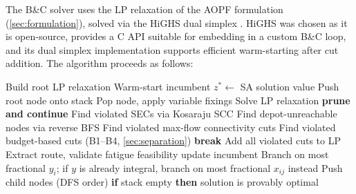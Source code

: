 \documentclass[11pt,a4paper]{article}
\begin{document}
The B\&C solver uses the LP relaxation of the AOPF formulation (\cref{sec:formulation}), solved via the HiGHS dual simplex \citep{huangfu2018highs}.
HiGHS was chosen as it is open-source, provides a C API suitable for embedding in a custom B\&C loop, and its dual simplex implementation supports efficient warm-starting after cut addition.
The algorithm proceeds as follows:

\begin{algorithm}[H]
\caption{Branch-and-Cut for AOPF}
\label{alg:bnc}
\begin{algorithmic}[1]
\State Build root LP relaxation
\State Warm-start incumbent $z^* \gets$ SA solution value
\State Push root node onto stack
  \State Pop node, apply variable fixings
   
    \State Solve LP relaxation
     \textbf{prune and continue} \EndIf
    \State Find violated SECs via Kosaraju SCC
    \State Find depot-unreachable nodes via reverse BFS
    \State Find violated max-flow connectivity cuts
    \State Find violated budget-based cuts (B1--B4, \cref{sec:separation})
     \textbf{break} \EndIf
    \State Add all violated cuts to LP
  \EndFor
    \State Extract route, validate fatigue feasibility
     update incumbent \EndIf
  \Else
    \State Branch on most fractional $y_i$; if $y$ is already integral, branch on most fractional $x_{ij}$ instead
    \State Push child nodes (DFS order)
  \EndIf
\EndWhile
\State \textbf{if} stack empty \textbf{then} solution is provably optimal
\end{algorithmic}
\end{algorithm}
\end{document}

